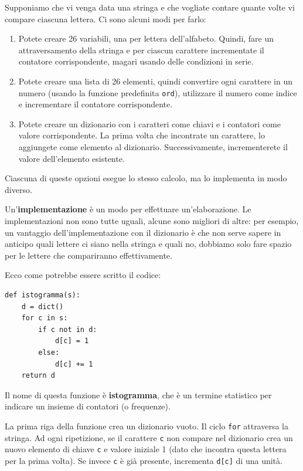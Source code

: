 \documentclass[10pt]{book}
\begin{document}
Supponiamo che vi venga data una stringa e che vogliate contare quante volte vi compare ciascuna lettera. Ci sono alcuni modi per farlo:

\begin{enumerate}

\item Potete creare 26 variabili, una per lettera dell'alfabeto. Quindi, fare un attraversamento della stringa e per ciascun carattere incrementate il contatore corrispondente, magari usando delle condizioni in serie.

\item Potete creare una lista di 26 elementi, quindi convertire ogni carattere in un numero (usando la funzione predefinita {\tt ord}), utilizzare il numero come indice e incrementare il contatore corrispondente.

\item Potete creare un dizionario con i caratteri come chiavi e i contatori come valore corrispondente. La prima volta che incontrate un carattere, lo aggiungete come elemento al dizionario. Successivamente, incrementerete il valore dell'elemento esistente.

\end{enumerate}

Ciascuna di queste opzioni esegue lo stesso calcolo, ma lo implementa in modo diverso.

Un'{\bf implementazione} è un modo per effettuare un'elaborazione. Le implementazioni non sono tutte uguali, alcune sono migliori di altre: per esempio, un vantaggio dell'implementazione con il dizionario è che non serve sapere in anticipo quali lettere ci siano nella stringa e quali no, dobbiamo solo fare spazio per le lettere che compariranno effettivamente.

Ecco come potrebbe essere scritto il codice:

\begin{verbatim}
def istogramma(s):
    d = dict()
    for c in s:
        if c not in d:
            d[c] = 1
        else:
            d[c] += 1
    return d
\end{verbatim}
%
Il nome di questa funzione è {\bf istogramma}, che è un termine statistico per indicare un insieme di contatori (o frequenze).

La prima riga della funzione crea un dizionario vuoto. Il ciclo {\tt for}  attraversa la stringa. Ad ogni ripetizione, se il carattere {\tt c} non compare nel dizionario crea un nuovo elemento di chiave {\tt c} e valore iniziale 1 (dato che incontra questa lettera per la prima volta). Se invece {\tt c} è già presente, incrementa {\tt d[c]} di una unità.
\end{document}
